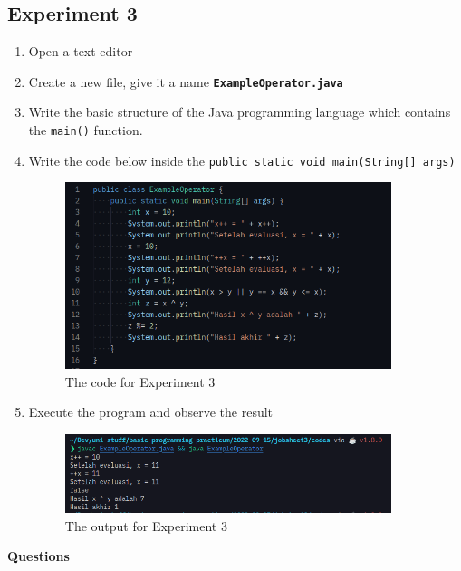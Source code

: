 \documentclass[12pt,titlepage]{article}
\begin{document}
\subsection{Experiment 3}
\begin{enumerate}
    \item Open a text editor
    \item Create a new file, give it a name \texttt{\textbf{ExampleOperator.java}}
    \item Write the basic structure of the Java programming language which contains the \texttt{main()} function.
    \item {
        Write the code below inside the \texttt{public static void main(String[] args)}

        \begin{figure}[h]
            \centering
            \includegraphics[width=0.9\textwidth]{./images/operator-code.png}
            \caption{The code for Experiment 3}
        \end{figure}
    }
    \item {
        Execute the program and observe the result

        \begin{figure}[h]
            \centering
            \includegraphics[width=0.9\textwidth]{./images/operator-output.png}
            \caption{The output for Experiment 3}
        \end{figure}
    }
\end{enumerate}
\pagebreak
\textbf{Questions}
\end{document}
